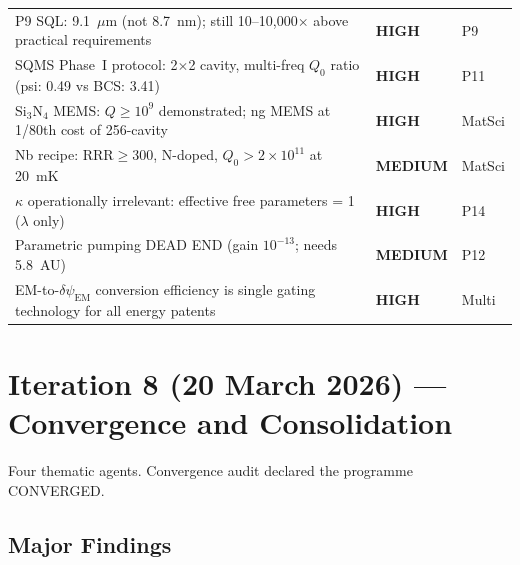 \documentclass[11pt,a4paper]{article}
\newcommand{\HIGH}{\textcolor{high}{\textbf{HIGH}}}
\newcommand{\MEDIUM}{\textcolor{medium}{\textbf{MEDIUM}}}
\begin{document}
\begin{longtable}{p{}p{}p{}}
P9 SQL: 9.1~$\mu$m (not 8.7~nm); still 10--10,000$\times$ above practical requirements & \HIGH & P9 \\
SQMS Phase~I protocol: 2$\times$2 cavity, multi-freq $Q_0$ ratio (psi: 0.49 vs BCS: 3.41) & \HIGH & P11 \\
Si$_3$N$_4$ MEMS: $Q\geq10^9$ demonstrated; ng MEMS at 1/80th cost of 256-cavity & \HIGH & MatSci \\
Nb recipe: RRR$\geq$300, N-doped, $Q_0>2\times10^{11}$ at 20~mK & \MEDIUM & MatSci \\
$\kappa$ operationally irrelevant: effective free parameters = 1 ($\lambda$ only) & \HIGH & P14 \\
Parametric pumping DEAD END (gain $10^{-13}$; needs 5.8~AU) & \MEDIUM & P12 \\
EM-to-$\delta\psi_\mathrm{EM}$ conversion efficiency is single gating technology for all energy patents & \HIGH & Multi \\
\bottomrule
\end{longtable}


\section{Iteration 8 (20 March 2026) --- Convergence and Consolidation}

Four thematic agents.  Convergence audit declared the programme CONVERGED.

\subsection{Major Findings}
\end{document}
